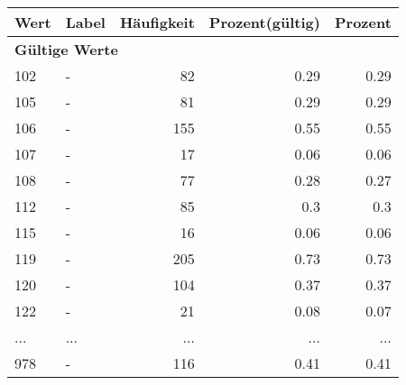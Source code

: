      \begin{longtable}{lXrrr}
     \toprule
     \textbf{Wert} & \textbf{Label} & \textbf{Häufigkeit} & \textbf{Prozent(gültig)} & \textbf{Prozent} \\
     \endhead
     \midrule
     \multicolumn{5}{l}{\textbf{Gültige Werte}}\\
        102 & \multicolumn{1}{X}{-} & %
          \num{82} &
          \num[round-mode=places,round-precision=2]{0,29} &
          \num[round-mode=places,round-precision=2]{0,29} \\
        105 & \multicolumn{1}{X}{-} & %
          \num{81} &
          \num[round-mode=places,round-precision=2]{0,29} &
          \num[round-mode=places,round-precision=2]{0,29} \\
        106 & \multicolumn{1}{X}{-} & %
          \num{155} &
          \num[round-mode=places,round-precision=2]{0,55} &
          \num[round-mode=places,round-precision=2]{0,55} \\
        107 & \multicolumn{1}{X}{-} & %
          \num{17} &
          \num[round-mode=places,round-precision=2]{0,06} &
          \num[round-mode=places,round-precision=2]{0,06} \\
        108 & \multicolumn{1}{X}{-} & %
          \num{77} &
          \num[round-mode=places,round-precision=2]{0,28} &
          \num[round-mode=places,round-precision=2]{0,27} \\
        112 & \multicolumn{1}{X}{-} & %
          \num{85} &
          \num[round-mode=places,round-precision=2]{0,3} &
          \num[round-mode=places,round-precision=2]{0,3} \\
        115 & \multicolumn{1}{X}{-} & %
          \num{16} &
          \num[round-mode=places,round-precision=2]{0,06} &
          \num[round-mode=places,round-precision=2]{0,06} \\
        119 & \multicolumn{1}{X}{-} & %
          \num{205} &
          \num[round-mode=places,round-precision=2]{0,73} &
          \num[round-mode=places,round-precision=2]{0,73} \\
        120 & \multicolumn{1}{X}{-} & %
          \num{104} &
          \num[round-mode=places,round-precision=2]{0,37} &
          \num[round-mode=places,round-precision=2]{0,37} \\
        122 & \multicolumn{1}{X}{-} & %
          \num{21} &
          \num[round-mode=places,round-precision=2]{0,08} &
          \num[round-mode=places,round-precision=2]{0,07} \\
       ... & ... & ... & ... & ... \\
        978 & \multicolumn{1}{X}{-} & %
          \num{116} &
          \num[round-mode=places,round-precision=2]{0,41} &
          \num[round-mode=places,round-precision=2]{0,41} \\


\end{longtable}
